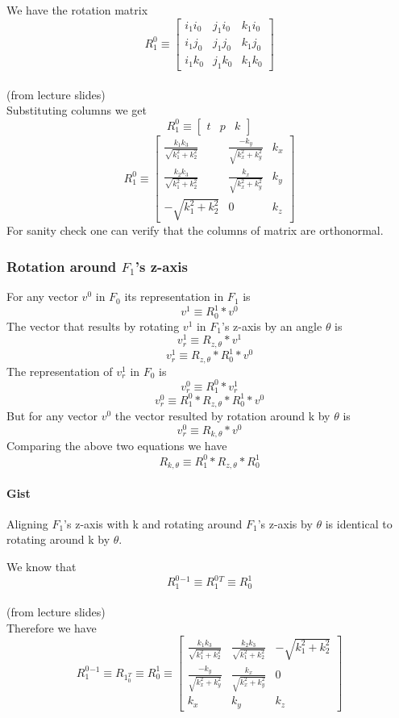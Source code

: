 \documentclass[12pt]{article}
\newcommand{\fromlectures}{{\\ \color{blue} \hspace*{\fill}(from lecture slides)} \\}
\begin{document}
We have the rotation matrix
\[
  R_1^0 \equiv \begin{bmatrix} i_1i_0 & j_1i_0 & k_1i_0 \\ i_1j_0 & j_1j_0 & k_1j_0 \\ i_1k_0 & j_1k_0 & k_1k_0 \end{bmatrix}
\]
\fromlectures
Substituting columns we get
\[
  R_1^0 \equiv \begin{bmatrix} t & p & k \end{bmatrix}
\]
\[
  R_1^0 \equiv
  \begin{bmatrix}
  \frac{k_1k_3}{\sqrt{k_1^2 + k_2^2}} & \frac{-k_y}{\sqrt{k_x^2 + k_y^2}}  & k_x \\
  \frac{k_2k_3}{\sqrt{k_1^2 + k_2^2}} & \frac{k_x}{\sqrt{k_x^2 + k_y^2}}   & k_y \\
  -\sqrt{k_1^2 + k_2^2}               & 0 & k_z
  \end{bmatrix}
\]
For sanity check one can verify that the columns of matrix are orthonormal.

\subsubsection*{Rotation around $F_1$'s z-axis}
For any vector $ v^0 $ in $ F_0 $ its representation in $ F_1 $ is
\[
  v^1 \equiv R_0^1 * v^0
\]
The vector that results by rotating $ v^1 $ in $ F_1 $'s z-axis by an angle $ \theta $ is
\[
  v^1_r \equiv R_{z,\theta} * v^1
\]
\[
  v^1_r \equiv R_{z,\theta} * R_0^1 * v^0
\]
The representation of $ v^1_r $ in $ F_0 $ is
\[
  v^0_r \equiv R_1^0 * v^1_r
\]
\[
  v^0_r \equiv R_1^0 * R_{z,\theta} * R_0^1 * v^0
\]
But for any vector $ v^0 $ the vector resulted by rotation around k by $\theta$ is
\[
  v^0_r \equiv R_{k,\theta} * v^0
\]
Comparing the above two equations we have
\[
  R_{k,\theta} \equiv R_1^0 * R_{z,\theta} * R_0^1
\]
\paragraph{Gist} Aligning $ F_1 $'s z-axis with k and rotating around $ F_1 $'s z-axis by $ \theta $ is identical to rotating around k by $ \theta $.

We know that
\[
  R_1^0^{-1} \equiv R_1^0^T \equiv R_0^1
\]
\fromlectures
Therefore we have
\[
  R_1^0^{-1} \equiv R_1_0^T \equiv R_0^1 \equiv
  \begin{bmatrix}
  \frac{k_1k_3}{\sqrt{k_1^2 + k_2^2}} & \frac{k_2k_3}{\sqrt{k_1^2 + k_2^2}} & -\sqrt{k_1^2 + k_2^2} \\
  \frac{-k_y}{\sqrt{k_x^2 + k_y^2}}  & \frac{k_x}{\sqrt{k_x^2 + k_y^2}}   & 0 \\
  k_x & k_y & k_z
  \end{bmatrix}
\]
\end{document}
